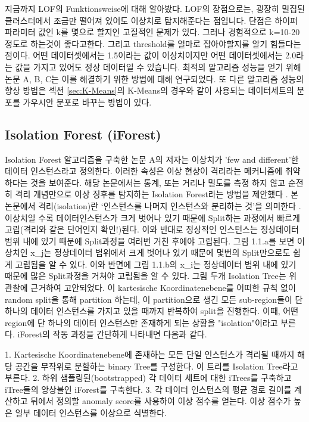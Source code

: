                 지금까지 LOF의 Funktionsweise에 대해 알아봤다. LOF의 장점으로는, 굉장히 밀집된 클러스터에서 조금만 떨어져 있어도 이상치로 탐지해준다는 점입니다. 단점은 하이퍼파라미터 값인 k를 몇으로 할지인 고질적인 문제가 있다. 그러나 경험적으로 k=10-20 \cite{Breunig00} 정도로 하는것이 좋다고한다. 그리고 threshold를 얼마로 잡아야할지를 알기 힘들다는 점이다. 어떤 데이터셋에서는 1.5이라는 값이 이상치이지만 어떤 데이터셋에서는 2.0라는 값을 가지고 있어도 정상 데이터일 수 있습니다. 최적의 알고리즘 성능을 얻기 위해 논문 A, B, C는 이를 해결하기 위한 방법에 대해 연구되었다. 또 다른 알고리즘 성능의 향상 방법은 섹션 \ref{sec:K-Means}의 K-Means의 경우와 같이 사용되는 데이터세트의 분포를 가우시안 분포로 바꾸는 방법이 있다.
                
            \subsection{Isolation Forest (iForest)}
                Isolation Forest 알고리즘을 구축한 논문 A의 저자는 이상치가 'few and different'한 데이터 인스턴스라고 정의한다. 이러한 속성은 이상 현상이 격리라는 메커니즘에 취약하다는 것을 보여준다. 해당 논문에서는 통계, 또는 거리나 밀도를 측정 하지 않고 순전히 격리 개념만으로 이상 징후를 탐지하는 Isolation Forest라는 방법을 제안했다 \cite{Liu08}. 본 논문에서 격리(isolation)란 ‘인스턴스를 나머지 인스턴스와 분리하는 것’을 의미한다 \cite{Liu08}. 이상치일 수록 데이터인스턴스가 크게 벗어나 있기 때문에 Split하는 과정에서 빠르게 고립(격리와 같은 단어인지 확인!)된다. 이와 반대로 정상적인 인스턴스는 정상데이터 범위 내에 있기 때문에 Split과정을 여러번 거친 후에야 고립된다. 그림 1.1.a를 보면 이상치인 x_j는 정상데이터 범위에서 크게 벗어나 있기 때문에 몇번의 Split만으로도 쉽게 고립됨을 알 수 있다. 이와 반면에 그림 1.1.b의 x_i는 정상데이터 범위 내에 있기 때문에 많은 Split과정을 거쳐야 고립됨을 알 수 있다. 
                그림 두개 \cite{Liu08}
                Isolation Tree는 위 관찰에 근거하여 고안되었다. 이 kartesische Koordinatenebene를 어떠한 규칙 없이 random split을 통해 partition 하는데, 이 partition으로 생긴 모든 sub-region들이 단 하나의 데이터 인스턴스를 가지고 있을 때까지 반복하여 split을 진행한다. 이때, 어떤 region에 단 하나의 데이터 인스턴스만 존재하게 되는 상황을 "isolation"이라고 부른다. iForest의 작동 과정을 간단하게 나타내면 다음과 같다.

                    1. Kartesische Koordinatenebene에 존재하는 모든 단일 인스턴스가 격리될 때까지 해당 공간을 무작위로 분할하는 binary Tree를 구성한다. 이 트리를 Isolation Tree라고 부른다.
                    2. 하위 샘플링된(bootstrapped) 각 데이터 세트에 대한 iTrees를 구축하고 iTree들의 앙상블인 iForest를 구축한다.
                    3. 각 데이터 인스턴스의 평균 경로 길이를 계산하고 뒤에서 정의할 anomaly score를 사용하여 이상 점수를 얻는다. 이상 점수가 높은 일부 데이터 인스턴스를 이상으로 식별한다.

